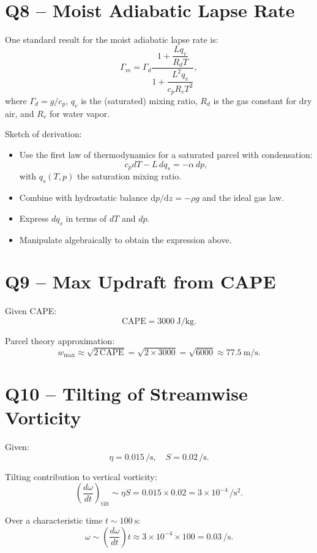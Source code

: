 \documentclass[12pt,a4paper]{article}
\begin{document}
\section*{Q8 -- Moist Adiabatic Lapse Rate}

One standard result for the moist adiabatic lapse rate is:
\[
\Gamma_m
= \Gamma_d
\frac{1 + \dfrac{L q_v}{R_d T}}
     {1 + \dfrac{L^2 q_v}{c_p R_v T^2}},
\]
where
\(\Gamma_d = g/c_p\),
\(q_v\) is the (saturated) mixing ratio, \(R_d\) is the gas constant
for dry air, and \(R_v\) for water vapor.

Sketch of derivation:
\begin{itemize}
  \item Use the first law of thermodynamics for a saturated parcel
        with condensation:
        \[
        c_p dT - L \,dq_s = -\alpha\,dp,
        \]
        with \(q_s(T,p)\) the saturation mixing ratio.
  \item Combine with hydrostatic balance
        \(\mathrm{d}p/\mathrm{d}z = -\rho g\) and the ideal gas law.
  \item Express \(dq_s\) in terms of \(dT\) and \(dp\).
  \item Manipulate algebraically to obtain the expression above.
\end{itemize}

\section*{Q9 -- Max Updraft from CAPE}

Given CAPE:
\[
\text{CAPE} = \SI{3000}{\joule\per\kilo\gram}.
\]

Parcel theory approximation:
\[
w_{\max} \approx \sqrt{2\,\text{CAPE}}
= \sqrt{2\times 3000}
= \sqrt{6000}
\approx \SI{77.5}{\meter\per\second}.
\]

\section*{Q10 -- Tilting of Streamwise Vorticity}

Given:
\[
\eta = 0.015 \,\si{\per\second},
\quad
S = 0.02 \,\si{\per\second}.
\]

Tilting contribution to vertical vorticity:
\[
\left(\frac{d\omega}{dt}\right)_{\text{tilt}}
\sim \eta S
= 0.015 \times 0.02
= 3\times 10^{-4} \,\si{\per\second\squared}.
\]

Over a characteristic time
\(t \sim \SI{100}{\second}\):
\[
\omega \sim
\left(\frac{d\omega}{dt}\right)t
\approx 3\times 10^{-4} \times 100
= 0.03 \,\si{\per\second}.
\]
\end{document}
